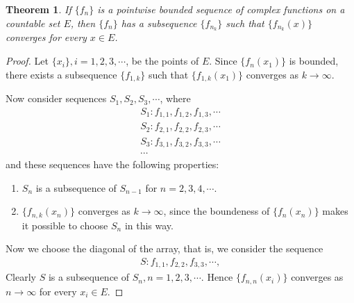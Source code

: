\documentclass[10pt]{book}
\newtheorem{theorem}{Theorem}[chapter]
\theoremstyle{definition}
\numberwithin{equation}{chapter}
\begin{document}
\begin{theorem}\label{th_614}
If $\{f_n\}$ is a pointwise bounded sequence of complex functions on a countable set $E$, then $\{f_n\}$ has a subsequence $\{f_{n_k}\}$ such that $\{f_{n_k}(x)\}$ converges for every $x \in E$.
\end{theorem}
\begin{proof}
Let $\{x_i\}, i = 1,2,3,\cdots$, be the points of $E$. Since $\{f_n(x_1)\}$ is bounded, there exists a subsequence $\{f_{1,k}\}$ such that $\{f_{1,k}(x_1)\}$ converges as $k \to \infty$.

Now consider sequences $S_1, S_2, S_3, \cdots$, where
\begin{align*}
    S_1: f_{1,1}, f_{1,2}, f_{1,3}, \cdots \\
    S_2: f_{2,1}, f_{2,2}, f_{2,3}, \cdots \\
    S_3: f_{3,1}, f_{3,2}, f_{3,3}, \cdots \\
    \cdots
\end{align*}
and these sequences have the following properties:
\begin{enumerate}[label=(\alph*)]
    \item $S_n$ is a subsequence of $S_{n-1}$ for $n = 2,3,4,\cdots$.
    
    \item $\{f_{n,k}(x_n)\}$ converges as $k \to \infty$, since the boundeness of $\{f_n(x_n)\}$ makes it possible to choose $S_n$ in this way.
    
\end{enumerate}
Now we choose the diagonal of the array, that is, we consider the sequence
\begin{align*}
    S: f_{1,1}, f_{2,2}, f_{3,3}, \cdots,
\end{align*}
Clearly $S$ is a subsequence of $S_n, n = 1,2,3,\cdots$. Hence $\{f_{n,n}(x_i)\}$ converges as $n \to \infty$ for every $x_i \in E$.
\end{proof}

\medskip
\end{document}
